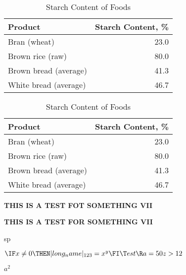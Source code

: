 \documentclass{article}
\begin{document}
\ISBN

\EANisbn[SC5b,ISBN=9780552151740]

\EOtze\\
\EOsacrifice

 \begin{table}
   \caption{Starch Content of Foods}
   \label{tab:starch}
   \begin{tabular}{@{}lr}
     \toprule
      Product        &  Starch Content, \% \\ 
     \midrule
      Bran (wheat)           & 23.0\\
      Brown rice (raw)       & 80.0\\
      Brown bread (average)  & 41.3\\
      White bread (average)  & 46.7\\
     \bottomrule
   \end{tabular}
 \end{table}

 \begin{table}
   \caption{Starch Content of Foods}
   \label{tab:starch}
   \begin{tabular}{lr}
     \toprule
      Product        &  Starch Content, \% \\ 
     \midrule
      Bran (wheat)           & 23.0\\
      Brown rice (raw)       & 80.0\\
      Brown bread (average)  & 41.3\\
      White bread (average)  & 46.7\\
     \bottomrule
   \end{tabular}
 \end{table}
\makeatletter
{\bf\huge THIS IS A TEST FOT SOMETHING VII}

\begin{trjnfamily}
{\bf\huge THIS IS A TEST FOR SOMETHING VII}
\end{trjnfamily}


   sp 

  \the\@tempdimc




\obeylines\obeyspaces
\(\IF x \ne 0 \THEN |long_name|_{123} = x^y \FI
	\T est
    \R  a=50  z>12

\)

\(a^2\)
\end{document}
